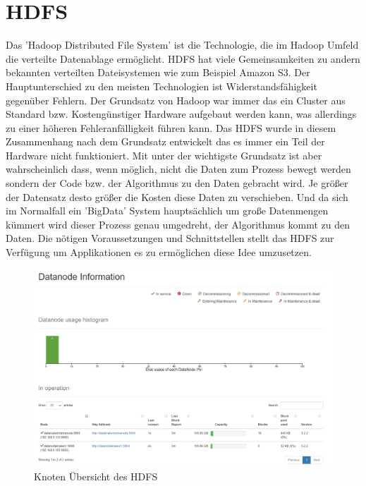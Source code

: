 \documentclass[12pt,oneside,a4paper,parskip]{scrbook}
\begin{document}
\section{HDFS}
Das 'Hadoop Distributed File System' ist die Technologie, die im Hadoop Umfeld die verteilte Datenablage erm\"oglicht. HDFS hat viele Gemeinsamkeiten zu andern bekannten verteilten Dateisystemen wie zum Beispiel Amazon S3. Der Hauptunterschied zu den meisten Technologien ist Widerstandsf\"ahigkeit gegen\"uber Fehlern. Der Grundsatz von Hadoop war immer das ein Cluster aus Standard bzw. Kosteng\"unstiger Hardware aufgebaut werden kann, was allerdings zu einer h\"oheren Fehleranf\"alligkeit f\"uhren kann. Das HDFS wurde in diesem Zusammenhang nach dem Grundsatz entwickelt das es immer ein Teil der Hardware nicht funktioniert.\cite{hdfsFailure} \newline
Mit unter der wichtigste Grundsatz ist aber wahrscheinlich dass, wenn m\"oglich, nicht die Daten zum Prozess bewegt werden sondern der Code bzw. der Algorithmus zu den Daten gebracht wird.\cite{movingComputation} Je gr\"oßer der Datensatz desto gr\"oßer die Kosten diese Daten zu verschieben. Und da sich im Normalfall ein 'BigData' System haupts\"achlich um große Datenmengen k\"ummert wird dieser Prozess genau umgedreht, der Algorithmus kommt zu den Daten. Die n\"otigen Voraussetzungen und Schnittstellen stellt das HDFS zur Verf\"ugung um Applikationen es zu erm\"oglichen diese Idee umzusetzen.
\begin{figure}[H]
	\centering
	\includegraphics[scale=0.5]{hdfsOverviewNodes.png}
	\captionsetup{justification=centering}
	\caption{Knoten \"Ubersicht des HDFS}
	\label{pic:hdfsOverviewNodes}
\end{figure}
\end{document}
